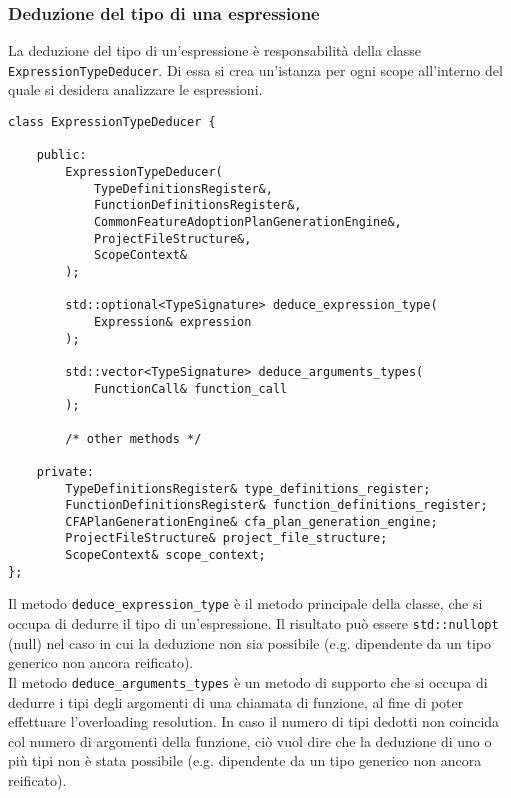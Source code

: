 \subsubsection{Deduzione del tipo di una espressione}
La deduzione del tipo di un'espressione è responsabilità della classe \texttt{ExpressionTypeDeducer}. 
Di essa si crea un'istanza per ogni scope all'interno del quale si desidera analizzare le espressioni. \\

\vspace{0.5cm}
\begin{lstlisting}[frame=single]
class ExpressionTypeDeducer {
    
    public:
        ExpressionTypeDeducer(
            TypeDefinitionsRegister&,
            FunctionDefinitionsRegister&,
            CommonFeatureAdoptionPlanGenerationEngine&,
            ProjectFileStructure&,
            ScopeContext&
        );

        std::optional<TypeSignature> deduce_expression_type(
            Expression& expression
        );

        std::vector<TypeSignature> deduce_arguments_types(
            FunctionCall& function_call
        );

        /* other methods */

    private:
        TypeDefinitionsRegister& type_definitions_register;
        FunctionDefinitionsRegister& function_definitions_register;
        CFAPlanGenerationEngine& cfa_plan_generation_engine;
        ProjectFileStructure& project_file_structure;
        ScopeContext& scope_context;
};
\end{lstlisting}
\vspace{0.5cm}

Il metodo \texttt{deduce\_expression\_type} è il metodo principale della classe, che si occupa di dedurre 
il tipo di un'espressione. Il risultato può essere \texttt{std::nullopt} (null) nel caso in cui la 
deduzione non sia possibile (e.g. dipendente da un tipo generico non ancora reificato). \\

Il metodo \texttt{deduce\_arguments\_types} è un metodo di supporto che si occupa di dedurre i tipi
degli argomenti di una chiamata di funzione, al fine di poter effettuare l'overloading resolution. In caso 
il numero di tipi dedotti non coincida col numero di argomenti della funzione, ciò vuol dire che la deduzione 
di uno o più tipi non è stata possibile (e.g. dipendente da un tipo generico non ancora reificato). \\

